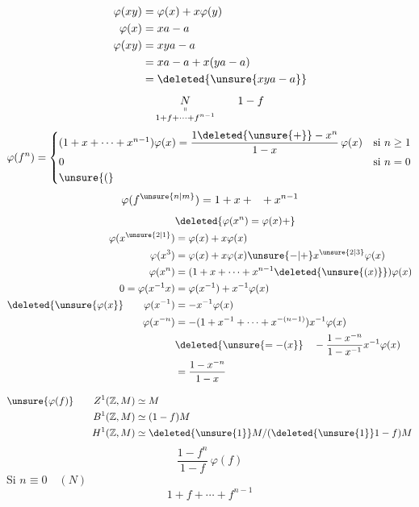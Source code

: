 {\[
\begin{aligned}
\varphi(xy)&=\varphi(x)+x\varphi(y)\\
\varphi(x)&=xa-a\\
\varphi(xy)&=xya-a\\
&=xa-a+x(ya-a)\\
&=\deleted{\unsure{xya-a}}
\end{aligned}
\]
\[
\underset{\substack{\shortparallel\\1+f+\cdots+f^{n-1}}}{N}\qquad 1-f
\]
\[
\varphi(f^n)=
\begin{cases}
(1+x+\cdots+x^{n-1})\varphi(x)=\dfrac{1\deleted{\unsure{+}}-x^n}{1-x}\,\varphi(x)&\text{si }n\geq1\\
0&\text{si }n=0\\
\unsure{(}&
\end{cases}
\]
\[
\varphi(f^{\unsure{n|m}})=1+x+\phantom{x} +x^{n-1}
\]
\[
\begin{aligned}
&\deleted{\varphi(x^n)=\varphi(x)+}\\
\varphi(x^{\unsure{2|1}})&=\varphi(x)+x\varphi(x)\\
\varphi(x^3)&=\varphi(x)+x\varphi(x)\unsure{-|+}x^{\unsure{2|3}}\varphi(x)\\
\varphi(x^n)&=(1+x+\cdots+x^{n-1}\deleted{\unsure{(x)}})\varphi(x)\\
0=\varphi(x^{-1}x)&=\varphi(x^{-1})+x^{-1}\varphi(x)\\
\deleted{\unsure{\varphi(x}}\qquad\varphi(x^{-1})&=-x^{-1}\varphi(x)\\
\varphi(x^{-n})&=-(1+x^{-1}+\cdots+x^{-(n-1)})x^{-1}\varphi(x)\\
&\deleted{\unsure{=-(x}}\quad-\frac{1-x^{-n}}{1-x^{-1}}x^{-1}\varphi(x)\\
&=\frac{1-x^{-n}}{1-x}
\end{aligned}
\]

\[
\begin{aligned}
\unsure{\varphi(f)}\qquad Z^1(\mathbb{Z},M)&\simeq M\\
B^1(\mathbb{Z},M)&\simeq (1-f)M\\
H^1(\mathbb{Z},M)&\simeq \deleted{\unsure{1}}M/(\deleted{\unsure{1}}1-f)M
\end{aligned}
\]
\[
\frac{1-f^n}{1-f}\,\varphi(f)
\]
Si $n\equiv0\quad(N)$
\[
1+f+\cdots+f^{n-1}
\]
}

